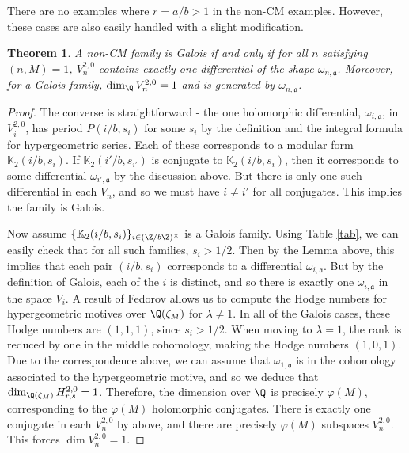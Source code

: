 \documentclass[12pt]{amsart}
\newtheorem{theorem}{Theorem}[section]
\theoremstyle{definition}
\theoremstyle{remark}
\begin{document}
There are no examples where $r=a/b>1$ in the non-CM examples. However, these cases are also easily handled with a slight modification.



\begin{theorem}
   A non-CM family is Galois if and only if for all $n$ satisfying $(n,M)=1$,  $V_n^{2,0}$ contains exactly one differential of the shape $\omega_{n,\mathfrak{a}}$. Moreover, for a Galois family, $\dim_{\Q}V_n^{2,0}=1$ and is generated by $\omega_{n,\mathfrak{a}}$.
\end{theorem}
\begin{proof}
The converse is straightforward - the one holomorphic differential, $\omega_{i,\mathfrak{a}}$, in $V_{i}^{2,0}$, has period $P(i/b,s_i)$ for some $s_i$ by the definition and the integral formula for hypergeometric series. Each of these corresponds to a modular form $\mathbb{K}_2(i/b,s_i)$. If $\mathbb{K}_2(i'/b,s_{i'})$ is conjugate to $\mathbb{K}_2(i/b,s_i)$, then it corresponds to some differential $\omega_{i',\mathfrak{a}}$ by the discussion above. But there is only one such differential in each $V_n$, and so we must have $i\neq i'$ for all conjugates. This implies the family is Galois.


Now assume $\{\mathbb{K}_2(i/b,s_i)\}_{i\in (\Z/b\Z)^\times}$ is a Galois family. Using Table \ref{tab}, we can easily check that for all such families, $s_i>1/2$. Then by the Lemma above, this implies that each pair $(i/b,s_i)$ corresponds to a differential $\omega_{i,\mathfrak{a}}$. But by the definition of Galois, each of the $i$ is distinct, and so there is exactly one $\omega_{i,\mathfrak{a}}$ in the space $V_i$. A result of Fedorov \cite{fedorov} allows us to compute the Hodge numbers for hypergeometric motives over $\Q(\zeta_M)$ for $\lambda\neq 1$. In all of the Galois cases, these Hodge numbers are $(1,1,1)$, since $s_i>1/2$. When moving to $\lambda=1$, the rank is reduced by one in the middle cohomology, making the Hodge numbers $(1,0,1)$. Due to the correspondence above, we can assume that $\omega_{1,\mathfrak{a}}$ is in the cohomology associated to the hypergeometric motive, and so we deduce that $\dim_{\Q(\zeta_M)}H_{r,s}^{2,0}=1$. Therefore, the dimension over $\Q$ is precisely $\varphi(M)$, corresponding to the $\varphi(M)$ holomorphic conjugates. There is exactly one conjugate in each $V_{n}^{2,0}$ by above, and there are precisely $\varphi(M)$ subspaces $V_{n}^{2,0}$. This forces $\dim V_n^{2,0}=1$.
\end{proof}
\end{document}
